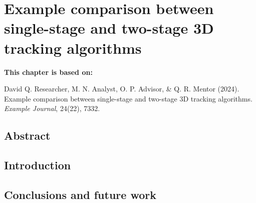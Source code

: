 \chapter[Example comparison between single-stage and two-stage 3D tracking algorithms]{Example comparison between single-stage and two-stage 3D tracking algorithms}
\label{cha:chapter5}
\vspace*{\fill}
\textbf{This chapter is based on:}

David Q. Researcher, M. N. Analyst, O. P. Advisor, \& Q. R. Mentor (2024). Example comparison between single-stage and two-stage 3D tracking algorithms. \textit{Example Journal}, 24(22), 7332.
\newpage

\section*{Abstract}
\lipsum[1]

\newpage

\section{Introduction}

\lipsum[1-3]

\section{Conclusions and future work} 
\lipsum[4]